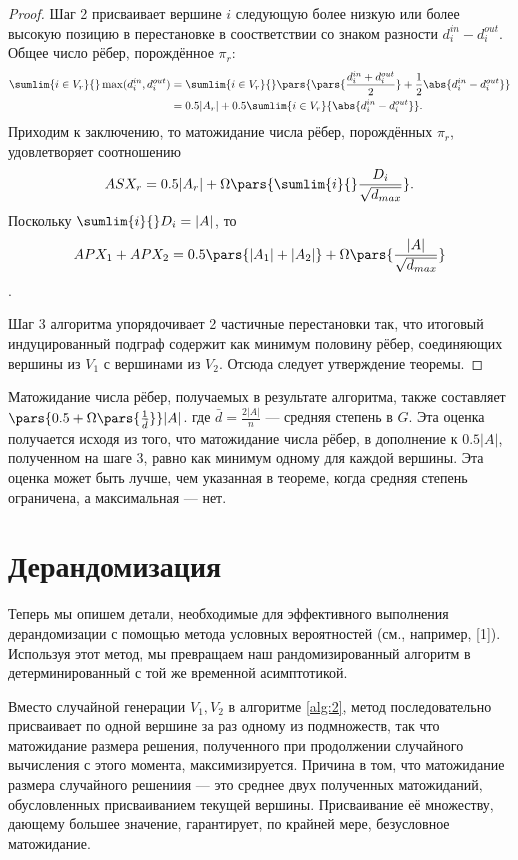 \documentclass[a4paper, 12pt, oneside]{extarticle}  %
\begin{document}
\begin{proof}
  Шаг 2 присваивает вершине $i$ следующую более низкую или более высокую позицию в перестановке в соостветствии со знаком разности $d_i^{in} - d_i^{out}$. Общее число рёбер, порождённое $\pi_r$:
  \begin{align*}
    \sumlim{i\in V_r}{} \max(d_i^{in}, d_i^{out}) & = \sumlim{i\in V_r}{} \pars{\pars{\frac{d_i^{in} + d_i^{out}}{2}} + \frac{1}{2}\abs{d_i^{in} - d_i^{out}}}
    \\
                                                  & = 0.5|A_r| + 0.5\sumlim{i\in V_r}{\abs{d_i^{in} - d_i^{out}}}.
  \end{align*}
  Приходим к заключению, то матожидание числа рёбер, порождённых $\pi_r$, удовлетворяет соотношению
  \[ASX_{r} = 0.5|A_r| + \Omega\pars{\sumlim{i}{}\frac{D_i}{\sqrt{d_{max}}}}.\]
  Поскольку $\sumlim{i}{}D_i = |A|$, то
  \[APX_1 + APX_2 = 0.5\pars{|A_1| + |A_2|} + \Omega\pars{\frac{|A|}{\sqrt{d_{max}}}}\].

  Шаг 3 алгоритма упорядочивает 2 частичные перестановки так, что итоговый индуцированный подграф содержит как минимум половину рёбер, соединяющих вершины из $V_1$ с вершинами из $V_2$. Отсюда следует утверждение теоремы.
\end{proof}

\begin{remark}\label{rem:4}
  Матожидание числа рёбер, получаемых в результате алгоритма, также составляет $\pars{0.5 + \Omega \pars{\frac{1}{\bar{d}}}}|A|$. где $\bar{d} = \frac{2|A|}{n}$ --- средняя степень в $G$. Эта оценка получается исходя из того, что матожидание числа рёбер, в дополнение к $0.5|A|$, полученном на шаге 3, равно как минимум одному для каждой вершины. Эта оценка может быть лучше, чем указанная в теореме, когда средняя степень ограничена, а максимальная --- нет.
\end{remark}


\section{Дерандомизация}

Теперь мы опишем детали, необходимые для эффективного выполнения дерандомизации с помощью метода условных вероятностей (см., например, [1]). Используя этот метод, мы превращаем наш рандомизированный алгоритм в детерминированный с той же временной асимптотикой.

Вместо случайной генерации $V_1, V_2$ в алгоритме \ref{alg:2}, метод последовательно присваивает по одной вершине за раз одному из подмножеств, так что матожидание размера решения, полученного при продолжении случайного вычисления с этого момента, максимизируется. Причина в том, что матожидание размера случайного решениия --- это среднее двух полученных матожиданий, обусловленных присваиванием текущей вершины. Присваивание её множеству, дающему большее значение, гарантирует, по крайней мере, безусловное матожидание.
\end{document}
